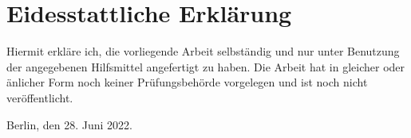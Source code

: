 \chapter*{Eidesstattliche Erkl\"{a}rung}
Hiermit erkl\"{a}re ich, die vorliegende Arbeit selbst\"{a}ndig und nur unter Benutzung der angegebenen Hilfsmittel angefertigt zu haben.
Die Arbeit hat in gleicher oder \"{a}nlicher Form noch keiner Pr\"{u}fungsbeh\"{o}rde vorgelegen und ist noch nicht ver\"{o}ffentlicht.

Berlin, den 28. Juni 2022.

